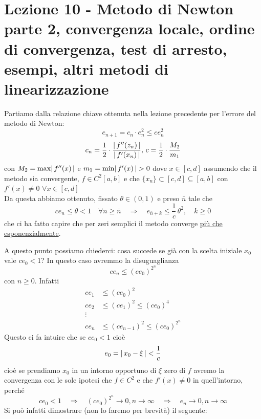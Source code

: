 \section[Lezione 10 - Ordine di convergenza]{Lezione 10 - Metodo di Newton parte 2, convergenza locale, ordine di convergenza, test di arresto, esempi, altri metodi di linearizzazione}
Partiamo dalla relazione chiave ottenuta nella lezione precedente per l'errore del metodo di Newton:
\[ e_{n+1} = c_n \cdot e_n^2 \leq c e_n^2 \]
\[ c_n = \frac{1}{2} \cdot \frac{\lvert\,f''(z_n)\,\rvert}{\lvert\,f'(x_n)\,\rvert}, \, c = \frac{1}{2} \cdot \frac{M_2}{m_1} \]
con $M_2 = \max\lvert\,f''(x)\,\rvert$ e $m_1 = \min\lvert\,f'(x)\,\rvert>0$ dove $x\in[c,d]$ assumendo che il metodo sia convergente, $f\in C^2[a,b]$ e che $\{ x_n\} \subset{[c,d]} \subseteq{[a,b]}$ con $f'(x)\neq0$ $\forall x\in[c,d]$ \\ 
Da questa abbiamo ottenuto, fissato $\theta\in (0,1)$ e preso $\bar{n}$ tale che 
\[ce_n\leq\theta<1 \quad \forall n\geq\bar{n} \quad \Longrightarrow \quad e_{\bar{n}+k}\leq\frac{1}{c}\,\theta^2, \quad k\geq0\] 
che ci ha fatto capire che per zeri semplici il metodo converge \uline{più che esponenzialmente}.

A questo punto possiamo chiederci: cosa succede se già con la scelta iniziale $x_0$ vale $ce_0<1$? In questo caso avremmo la disuguaglianza \[ ce_n\leq(ce_0)^{2^n} \]
con $n\geq0$. Infatti
\[\begin{split}
    ce_1 & \le (ce_0)^2 \\
    ce_2 & \le (ce_1)^2 \le (ce_0)^4 \\
    \vdots & \\
    ce_n & \le (ce_{n-1})^2 \le (ce_0)^{2^n}
\end{split}\]
Questo ci fa intuire che se $ce_0<1$ cioè 
\[e_0=\lvert\,x_0-\xi\,\rvert<\frac{1}{c}\] 
cioè se prendiamo $x_0$ in un intorno opportuno di $\xi$ zero di $f$ avremo la convergenza con le sole ipotesi che $f \in C^2$ e che $f'(x) \neq 0$ in quell'intorno, perché 
\[ ce_0<1 \quad \Rightarrow \quad (ce_0)^{2^n} \to 0, n\to \infty \quad \Rightarrow \quad e_n \to 0, n \to \infty \]
Si può infatti dimostrare (non lo faremo per brevità) il seguente:

